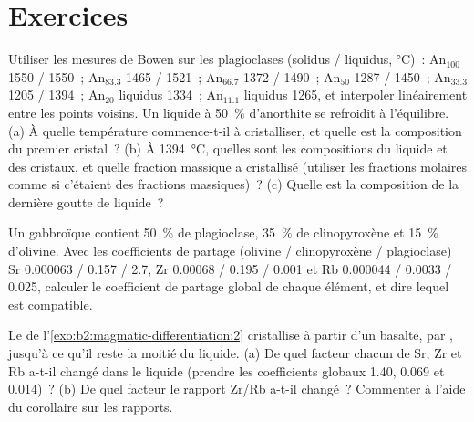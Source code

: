 \section{Exercices}

\begin{exercise}[$\star$]\label{exo:b2:magmatic-differentiation:1}
Utiliser les mesures de Bowen sur les plagioclases (solidus / liquidus, \unit{\celsius})~:
An$_{100}$ 1550 / 1550~; An$_{83.3}$ 1465 / 1521~; An$_{66.7}$ 1372 / 1490~; An$_{50}$
1287 / 1450~; An$_{33.3}$ 1205 / 1394~; An$_{20}$ liquidus 1334~; An$_{11.1}$ liquidus
1265, et interpoler linéairement entre les points voisins. Un liquide à
\qty{50}{\percent} d'anorthite se refroidit à l'équilibre. (a) À quelle température commence-t-il
à cristalliser, et quelle est la composition du premier cristal~? (b) À
\qty{1394}{\celsius}, quelles sont les compositions du liquide et des cristaux, et quelle fraction
massique a cristallisé (utiliser les fractions molaires comme si c'étaient des fractions massiques)~?
(c) Quelle est la composition de la dernière goutte de liquide~?
\end{exercise}

\begin{exercise}[$\star$]\label{exo:b2:magmatic-differentiation:2}
Un  gabbroïque contient \qty{50}{\percent} de plagioclase, \qty{35}{\percent}
de clinopyroxène et \qty{15}{\percent} d'olivine. Avec les coefficients de partage
(olivine / clinopyroxène / plagioclase) Sr 0.000063 / 0.157 / 2.7, Zr 0.00068 /
0.195 / 0.001 et Rb 0.000044 / 0.0033 / 0.025,
calculer le coefficient de partage global de chaque élément, et dire lequel est compatible.
\end{exercise}

\begin{exercise}[$\star$]\label{exo:b2:magmatic-differentiation:3}
Le  de l'\cref{exo:b2:magmatic-differentiation:2} cristallise à partir d'un basalte, par ,
jusqu'à ce qu'il reste la moitié du liquide. (a) De quel facteur chacun de Sr, Zr et Rb a-t-il changé
dans le liquide (prendre les coefficients globaux 1.40, 0.069 et 0.014)~? (b) De quel facteur le rapport Zr/Rb a-t-il changé~?
Commenter à l'aide du corollaire sur les rapports.
\end{exercise}

